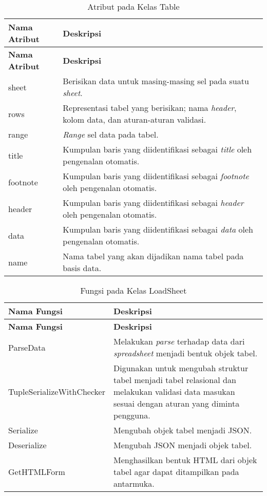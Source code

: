 \begin{small}
\begin{longtable}{ | p{3cm} | p{8cm} | }
    \caption{Atribut pada Kelas Table}
    \label{AtributTable}\\ \hline
    \centering\bfseries{Nama Atribut} & \centering\bfseries{Deskripsi} \tabularnewline \hline
    \endfirsthead
    \hline
    \centering\bfseries{Nama Atribut} & \centering\bfseries{Deskripsi} \tabularnewline \hline
    \endhead
    sheet & Berisikan data untuk masing-masing sel pada suatu \textit{sheet}.\\ \hline
    rows & Representasi tabel yang berisikan; nama \textit{header}, kolom data, dan aturan-aturan validasi.\\ \hline
    range & \textit{Range} sel data pada tabel.\\ \hline
    title & Kumpulan baris yang diidentifikasi sebagai \textit{title} oleh pengenalan otomatis.\\ \hline
    footnote & Kumpulan baris yang diidentifikasi sebagai \textit{footnote} oleh pengenalan otomatis.\\ \hline
    header & Kumpulan baris yang diidentifikasi sebagai \textit{header} oleh pengenalan otomatis.\\ \hline
    data & Kumpulan baris yang diidentifikasi sebagai \textit{data} oleh pengenalan otomatis.\\ \hline
    name & Nama tabel yang akan dijadikan nama tabel pada basis data.\\ \hline
\end{longtable}
\end{small}

\begin{small}
\begin{longtable}{ | p{4cm} | p{9cm} | }
    \caption{Fungsi pada Kelas LoadSheet}
    \label{FungsiLoadSheet}\\ \hline
    \centering\bfseries{Nama Fungsi} & \centering\bfseries{Deskripsi} \tabularnewline \hline
    \endfirsthead
    \hline
    \centering\bfseries{Nama Fungsi} & \centering\bfseries{Deskripsi} \tabularnewline \hline
    \endhead
    ParseData & Melakukan \textit{parse} terhadap data dari \textit{spreadsheet} menjadi bentuk objek tabel. \\ \hline
	TupleSerializeWithChecker & Digunakan untuk mengubah struktur tabel menjadi tabel relasional dan melakukan validasi data masukan sesuai dengan aturan yang diminta pengguna.\\ \hline
	Serialize & Mengubah objek tabel menjadi JSON.\\ \hline
	Deserialize & Mengubah JSON menjadi objek tabel.\\ \hline
	GetHTMLForm & Menghasilkan bentuk HTML dari objek tabel agar dapat ditampilkan pada antarmuka.\\ \hline
\end{longtable}
\end{small}